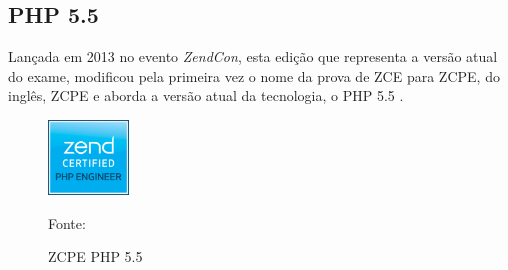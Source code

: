 \FloatBarrier 	%
				

\subsection{PHP 5.5}

Lançada em 2013 no evento \textit{ZendCon}, esta edição que representa a versão
atual do exame, modificou pela primeira vez o nome da prova de \acs{ZCE} para
\acs{ZCPE}, do inglês, \acl{ZCPE} e aborda a versão atual da tecnologia, o
PHP 5.5 \cite{entrevistaAriZCEBrasil}.

\begin{figure}[h!tb]
	\caption{ZCPE PHP 5.5}
	\label{fig:logoCertificationPHP55}

	\centering
	\includegraphics[width=0.19\textwidth]{images/logo/php5-5.png}

	\centering
	\footnotesize Fonte: 
\end{figure}

\FloatBarrier 	%
			
